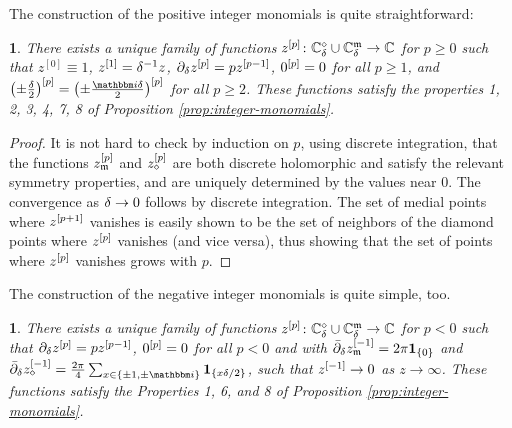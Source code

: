 \documentclass[12pt,oneside,english]{amsart}
\numberwithin{equation}{section}
\numberwithin{figure}{section}
\theoremstyle{plain}
\theoremstyle{plain}
\theoremstyle{plain}
\theoremstyle{plain}
\newtheorem{lem}[thm]{\protect\lemmaname}
\theoremstyle{remark}
\theoremstyle{definition}
\theoremstyle{plain}
\theoremstyle{plain}
\numberwithin{thm}{section}
\providecommand{\lemmaname}{Lemma}
\providecommand{\lemmaname}{Lemma}
\providecommand{\lemmaname}{Lemma}
\providecommand{\lemmaname}{Lemma}
\begin{document}
The construction of the positive integer monomials is quite straightforward: 
\begin{lem}
\label{lem:pos-int-mon}There exists a unique family of functions
${z^{[{p}]}}  \colon {\mathbb{C}_{{\delta}}^{\diamond}}\cup{\mathbb{C}_{{\delta}}^{\mathfrak{m}}}
\to \mathbb{C} $
for $p\geq0$ such that $z^{\left[0\right]}\equiv1$, $z^{[1]}={\delta}^{-1}z$,
${\partial}_{{\delta}} {z^{[{p}]}}  = p {z^{[{p-1}]}} $, ${0^{[{p}]}} = 0$
for all $p\geq1$, and 
$\left(\pm\frac{\meshsz}{2}\right)^{[p]}=\left(\pm\frac{\ii \meshsz 
}{2}\right)^{[p]}$
for all $p\geq2$. These functions satisfy the properties 1, 2, 3,
4, 7, 8 of Proposition \ref{prop:integer-monomials}. 
\end{lem}
\begin{proof}
It is not hard to check by induction on $p$, using discrete integration,
that the functions ${z_{\mathfrak{m}}^{[{p}]}}$ and 
${z_{\diamond}^{[{p}]}}$
are both discrete holomorphic and satisfy the relevant symmetry properties,
and are uniquely determined by the values near $0$. The convergence
as ${\delta} \to 0$ follows by discrete integration. The set of medial
points where ${z^{[{p+1}]}}$ vanishes is easily shown to be
the set of neighbors of the diamond points where ${z^{[{p}]}} $
vanishes (and vice versa), thus showing that the set of points where
${z^{[{p}]}} $ vanishes grows with $p$. 
\end{proof}
The construction of the negative integer monomials is quite simple,
too. 
\begin{lem}
\label{lem:neg-int-mon}
There exists a unique family of functions
${z^{[{p}]}}  \colon {\mathbb{C}_{{\delta}}^{\diamond}} \cup {\mathbb{C}_{{\delta}}^{\mathfrak{m}}} \to \mathbb{C} $
for $p<0$ such that ${\partial}_{{\delta}} {z^{[{p}]}} = p {z^{[{p-1}]}} $,
${0^{[{p}]}} = 0$ for all $p<0$ and with 
${{\bar{\partial}}}_{{\delta}} {z_{\mathfrak{m}}^{[{-1}]}}
    = {2\pi} \mathbf{1}_{\left\{  0 \right\}} $
and 
$\ddeebar \dmon{z_{\dmd}}{-1}
= \frac{{2\pi}}{4} \sum_{x \in \set{\pm 1 , \pm \ii}}
    \mathbf{1}_{\set{x\meshsz/2} }$,
such that ${z^{[{-1}]}}  \to 0$ as $z \to \infty$. These functions
satisfy the Properties 1, 6, and 8 of Proposition \ref{prop:integer-monomials}. 
\end{lem}
\end{document}
